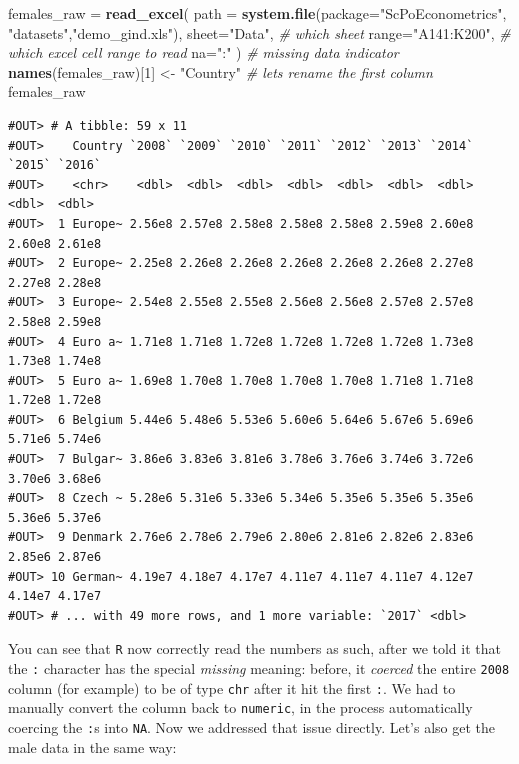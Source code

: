 \documentclass[]{book}
\newenvironment{Shaded}{\begin{snugshade}}{\end{snugshade}}
\newcommand{\KeywordTok}[1]{\textcolor[rgb]{0.13,0.29,0.53}{\textbf{#1}}}
\newcommand{\DataTypeTok}[1]{\textcolor[rgb]{0.13,0.29,0.53}{#1}}
\newcommand{\DecValTok}[1]{\textcolor[rgb]{0.00,0.00,0.81}{#1}}
\newcommand{\StringTok}[1]{\textcolor[rgb]{0.31,0.60,0.02}{#1}}
\newcommand{\CommentTok}[1]{\textcolor[rgb]{0.56,0.35,0.01}{\textit{#1}}}
\newcommand{\NormalTok}[1]{#1}
\theoremstyle{definition}
\theoremstyle{definition}
\theoremstyle{definition}
\theoremstyle{remark}
\begin{document}
\begin{Shaded}
\begin{Highlighting}[]
\NormalTok{females_raw =}\StringTok{ }\KeywordTok{read_excel}\NormalTok{(}
                \DataTypeTok{path =} \KeywordTok{system.file}\NormalTok{(}\DataTypeTok{package=}\StringTok{"ScPoEconometrics"}\NormalTok{,}
                                    \StringTok{"datasets"}\NormalTok{,}\StringTok{"demo_gind.xls"}\NormalTok{), }
                \DataTypeTok{sheet=}\StringTok{"Data"}\NormalTok{, }\CommentTok{# which sheet}
                \DataTypeTok{range=}\StringTok{"A141:K200"}\NormalTok{,  }\CommentTok{# which excel cell range to read}
                \DataTypeTok{na=}\StringTok{":"}\NormalTok{ )   }\CommentTok{# missing data indicator}
\KeywordTok{names}\NormalTok{(females_raw)[}\DecValTok{1}\NormalTok{] <-}\StringTok{ "Country"}   \CommentTok{# lets rename the first column}
\NormalTok{females_raw}
\end{Highlighting}
\end{Shaded}

\begin{verbatim}
#OUT> # A tibble: 59 x 11
#OUT>    Country `2008` `2009` `2010` `2011` `2012` `2013` `2014` `2015` `2016`
#OUT>    <chr>    <dbl>  <dbl>  <dbl>  <dbl>  <dbl>  <dbl>  <dbl>  <dbl>  <dbl>
#OUT>  1 Europe~ 2.56e8 2.57e8 2.58e8 2.58e8 2.58e8 2.59e8 2.60e8 2.60e8 2.61e8
#OUT>  2 Europe~ 2.25e8 2.26e8 2.26e8 2.26e8 2.26e8 2.26e8 2.27e8 2.27e8 2.28e8
#OUT>  3 Europe~ 2.54e8 2.55e8 2.55e8 2.56e8 2.56e8 2.57e8 2.57e8 2.58e8 2.59e8
#OUT>  4 Euro a~ 1.71e8 1.71e8 1.72e8 1.72e8 1.72e8 1.72e8 1.73e8 1.73e8 1.74e8
#OUT>  5 Euro a~ 1.69e8 1.70e8 1.70e8 1.70e8 1.70e8 1.71e8 1.71e8 1.72e8 1.72e8
#OUT>  6 Belgium 5.44e6 5.48e6 5.53e6 5.60e6 5.64e6 5.67e6 5.69e6 5.71e6 5.74e6
#OUT>  7 Bulgar~ 3.86e6 3.83e6 3.81e6 3.78e6 3.76e6 3.74e6 3.72e6 3.70e6 3.68e6
#OUT>  8 Czech ~ 5.28e6 5.31e6 5.33e6 5.34e6 5.35e6 5.35e6 5.35e6 5.36e6 5.37e6
#OUT>  9 Denmark 2.76e6 2.78e6 2.79e6 2.80e6 2.81e6 2.82e6 2.83e6 2.85e6 2.87e6
#OUT> 10 German~ 4.19e7 4.18e7 4.17e7 4.11e7 4.11e7 4.11e7 4.12e7 4.14e7 4.17e7
#OUT> # ... with 49 more rows, and 1 more variable: `2017` <dbl>
\end{verbatim}

You can see that \texttt{R} now correctly read the numbers as such,
after we told it that the \texttt{:} character has the special
\emph{missing} meaning: before, it \emph{coerced} the entire
\texttt{2008} column (for example) to be of type \texttt{chr} after it
hit the first \texttt{:}. We had to manually convert the column back to
\texttt{numeric}, in the process automatically coercing the \texttt{:}s
into \texttt{NA}. Now we addressed that issue directly. Let's also get
the male data in the same way:
\end{document}
